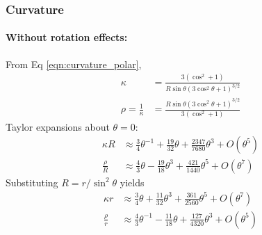 \documentclass{article}
\begin{document}
\subsubsection{Curvature}

\paragraph{Without rotation effects:}
From Eq \eqref{eqn:curvature_polar},
\begin{equation}
    \begin{aligned}
        \kappa &= \frac{3(\cos^2 + 1)}{R\sin\theta(3\cos^2\theta + 1)^{3/2}} \\
        \rho = \frac{1}{\kappa}
            &= \frac{R\sin\theta(3\cos^2\theta + 1)^{3/2}}{3(\cos^2 + 1)}
    \end{aligned}
\end{equation}
Taylor expansions about $\theta = 0$:
\begin{equation}
    \begin{aligned}
        \kappa R &\approx \frac34 \theta^{-1} + \frac{19}{32} \theta + \frac{2347}{7680} \theta^3 + O(\theta^5) \\
        \frac{\rho}{R} &\approx \frac43 \theta - \frac{19}{18}\theta^3 + \frac{421}{1440}\theta^5 + O(\theta^7)
    \end{aligned}
\end{equation}
Substituting $R = r/\sin^2\theta$ yields
\begin{equation}
    \begin{aligned}
        \kappa r &\approx \frac34 \theta + \frac{11}{32} \theta^3 + \frac{361}{2560} \theta^5 + O(\theta^7) \\
        \frac{\rho}{r} &\approx \frac43 \theta^{-1} - \frac{11}{18}\theta + \frac{127}{4320}\theta^3 + O(\theta^5)
    \end{aligned}
\end{equation}
\end{document}
